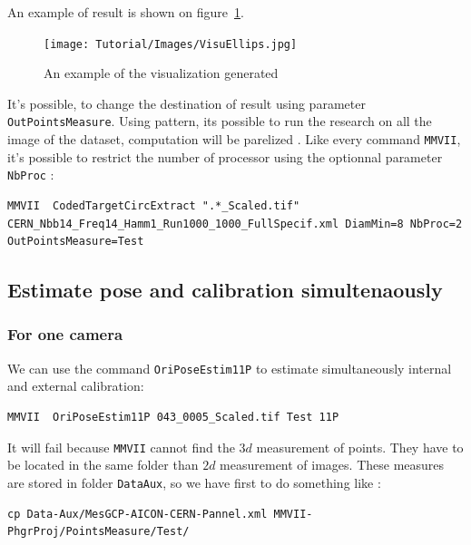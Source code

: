 An example of result is shown on figure~\ref{fig:CodeT:Panel}.

\begin{figure}
\centering
	\texttt{[image: Tutorial/Images/VisuEllips.jpg]}
	\caption{An example of the visualization generated}
\label{fig:CodeT:Panel}
\end{figure}

It's possible, to change the destination of result using parameter {\tt OutPointsMeasure}.
Using pattern, its possible to run the research on all the image of the dataset, computation will be parelized .
Like every command {\tt MMVII}, it's possible to restrict the number of processor using the optionnal parameter
{\tt NbProc} :

\begin{lstlisting}
MMVII  CodedTargetCircExtract ".*_Scaled.tif" CERN_Nbb14_Freq14_Hamm1_Run1000_1000_FullSpecif.xml DiamMin=8 NbProc=2 OutPointsMeasure=Test
\end{lstlisting}



\subsection{Estimate pose and calibration simultenaously}


\subsubsection{For one camera}

We can use the command {\tt OriPoseEstim11P} to estimate simultaneously internal and external
calibration:

\begin{lstlisting}
MMVII  OriPoseEstim11P 043_0005_Scaled.tif Test 11P
\end{lstlisting}

It will fail because {\tt MMVII} cannot find the $3d$ measurement of points. They 
have to be located in the same folder than $2d$ measurement of images.
These measures are stored in folder {\tt DataAux}, so we have first to do
something like :

\begin{lstlisting}
cp Data-Aux/MesGCP-AICON-CERN-Pannel.xml MMVII-PhgrProj/PointsMeasure/Test/
\end{lstlisting}

